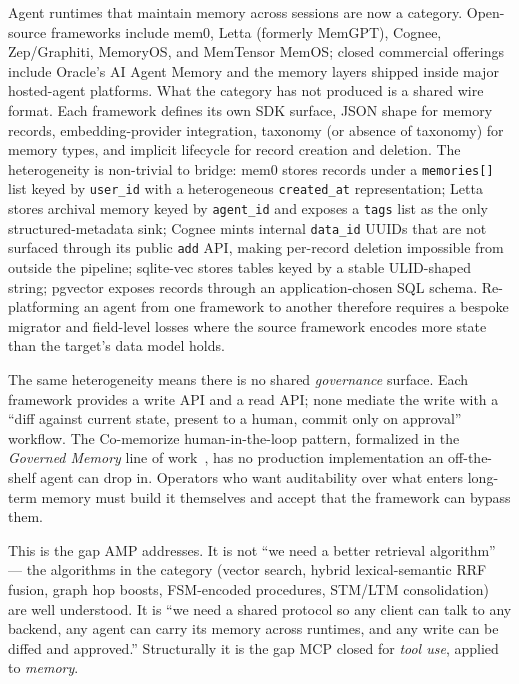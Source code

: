 \documentclass[11pt,letterpaper,twocolumn]{article}
\begin{document}
Agent runtimes that maintain memory across sessions are now a category. Open-source frameworks include mem0, Letta (formerly MemGPT), Cognee, Zep/Graphiti, MemoryOS, and MemTensor MemOS; closed commercial offerings include Oracle's AI Agent Memory and the memory layers shipped inside major hosted-agent platforms. What the category has not produced is a shared wire format. Each framework defines its own SDK surface, JSON shape for memory records, embedding-provider integration, taxonomy (or absence of taxonomy) for memory types, and implicit lifecycle for record creation and deletion. The heterogeneity is non-trivial to bridge: mem0 stores records under a \texttt{memories[]} list keyed by \texttt{user\_id} with a heterogeneous \texttt{created\_at} representation; Letta stores archival memory keyed by \texttt{agent\_id} and exposes a \texttt{tags} list as the only structured-metadata sink; Cognee mints internal \texttt{data\_id} UUIDs that are not surfaced through its public \texttt{add} API, making per-record deletion impossible from outside the pipeline; sqlite-vec stores tables keyed by a stable ULID-shaped string; pgvector exposes records through an application-chosen SQL schema. Re-platforming an agent from one framework to another therefore requires a bespoke migrator and field-level losses where the source framework encodes more state than the target's data model holds.

The same heterogeneity means there is no shared \emph{governance} surface. Each framework provides a write API and a read API; none mediate the write with a ``diff against current state, present to a human, commit only on approval'' workflow. The Co-memorize human-in-the-loop pattern, formalized in the \emph{Governed Memory} line of work~\cite{taheri2026governed}, has no production implementation an off-the-shelf agent can drop in. Operators who want auditability over what enters long-term memory must build it themselves and accept that the framework can bypass them.

This is the gap AMP addresses. It is not ``we need a better retrieval algorithm'' --- the algorithms in the category (vector search, hybrid lexical-semantic RRF fusion, graph hop boosts, FSM-encoded procedures, STM/LTM consolidation) are well understood. It is ``we need a shared protocol so any client can talk to any backend, any agent can carry its memory across runtimes, and any write can be diffed and approved.'' Structurally it is the gap MCP closed for \emph{tool use}, applied to \emph{memory}.
\end{document}
